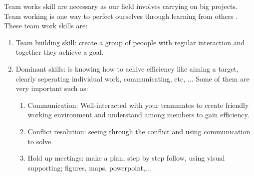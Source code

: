 \documentclass[a4paper, 10pt]{article}
\begin{document}
\noindent Team works skill are necessary as our field involves carrying on big projects. Team working is
one way to perfect ourselves through learning from others . These team work skills are:

\begin{enumerate}
    \item Team building skill: create a group of peoople with regular interaction and together they achieve a goal.
    \item Dominant skills: is knowing how to achive efficiency like aiming a target, clearly seperating individual work, communicating, etc, ... Some of them are very important such as:
    \begin{enumerate}
        \item Communication: Well-interacted with your teammates to create friendly working environment and understand among members to gain efficiency.
        \item Conflict resolution: seeing through the conflict and using communication to solve.
        \item Hold up meetings: make a plan, step by step follow, using visual supporting; figures, maps, powerpoint,...
    \end{enumerate}
\end{enumerate}
\end{document}
